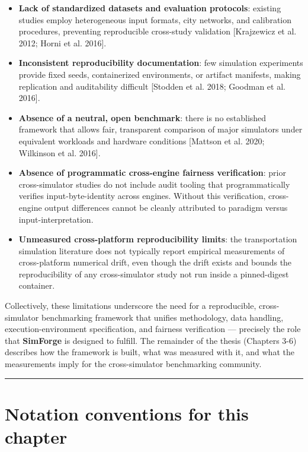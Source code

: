 \begin{itemize}
\item
  \textbf{Lack of standardized datasets and evaluation protocols}:
  existing studies employ heterogeneous input formats, city networks,
  and calibration procedures, preventing reproducible cross-study
  validation {[}Krajzewicz et al. 2012; Horni et al. 2016{]}.
\item
  \textbf{Inconsistent reproducibility documentation}: few simulation
  experiments provide fixed seeds, containerized environments, or
  artifact manifests, making replication and auditability difficult
  {[}Stodden et al. 2018; Goodman et al. 2016{]}.
\item
  \textbf{Absence of a neutral, open benchmark}: there is no established
  framework that allows fair, transparent comparison of major simulators
  under equivalent workloads and hardware conditions {[}Mattson et al.
  2020; Wilkinson et al. 2016{]}.
\item
  \textbf{Absence of programmatic cross-engine fairness verification}:
  prior cross-simulator studies do not include audit tooling that
  programmatically verifies input-byte-identity across engines. Without
  this verification, cross-engine output differences cannot be cleanly
  attributed to paradigm versus input-interpretation.
\item
  \textbf{Unmeasured cross-platform reproducibility limits}: the
  transportation simulation literature does not typically report
  empirical measurements of cross-platform numerical drift, even though
  the drift exists and bounds the reproducibility of any cross-simulator
  study not run inside a pinned-digest container.
\end{itemize}

Collectively, these limitations underscore the need for a reproducible,
cross-simulator benchmarking framework that unifies methodology, data
handling, execution-environment specification, and fairness verification
--- precisely the role that \textbf{SimForge} is designed to fulfill.
The remainder of the thesis (Chapters 3-6) describes how the framework
is built, what was measured with it, and what the measurements imply for
the cross-simulator benchmarking community.

\begin{center}\rule{0.5\linewidth}{0.5pt}\end{center}

\section{Notation conventions for this
chapter}\label{29-notation-conventions-for-this-chapter}

